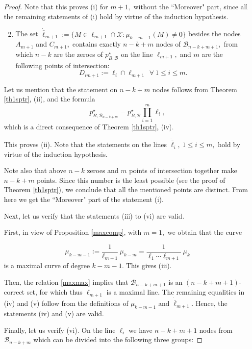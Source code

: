 \documentclass[a4paper,12pt]{article}
\theoremstyle{definition}
\numberwithin{equation}{section}
\numberwithin{figure}{section}
\newcommand{\Bset}{\mathcal{B}}
\newcommand{\Xset}{\mathcal{X}}
\begin{document}
\begin{proof}
Note that this proves (i) for $m+1,$ without the ``Moreover" part, since all the remaining statements of (i) hold by virtue of the induction hypothesis.
\begin{enumerate}[label*=\arabic*.]
\setcounter{enumi}{1}
\setlength{\itemsep}{0mm}
\item
The set $\dot{\bar\ell}_{m+1}:=\{M\in \ell_{m+1}\cap  \Xset: \mu_{k-m-1}(M)
\neq 0\}$ 
besides the nodes $A_{m+1}$ and $C_{m+1},$ contains exactly $n-k+m$ nodes of $\Bset_{n-k+m+1},$ from which $n-k$ are the zeroes of $p^\star_{B,\Bset}$ on the line $\ell_{m+1},$  and $m$ are the following points of intersection: 
$$D_{im+1}:=\ell_i\cap\ell_{m+1}\ \ \forall\ 1\le i \le m.$$ 
\end{enumerate}
Let us mention that the statement on $n-k+m$ nodes follows from Theorem \ref{th1sptr}, (ii), and  the formula
\begin{equation*}p^\star_{B,\Bset_{n-k+m}}=p^\star_{B,\Bset}\prod_{i=1}^m\ell_i,
\end{equation*}
 which is a direct consequence of Theorem \ref{th1sptr}, (iv).

\noindent This proves (ii). Note that the statements on the lines $\dot{\bar\ell}_i,\ 1\le i\le m,$ hold by virtue of the induction hypothesis.

Note also that above $n-k$ zeroes and $m$ points of intersection together make 
$n-k+m$ points. Since this number is the least possible (see the proof of Theorem \ref{th1sptr}), we conclude that all the mentioned
points are distinct. From here we get the ``Moreover" part of the statement (i).  

Next, let us verify that the statements (iii) to (vi) are valid.

First, in view of Proposition \ref{maxcomp}, with $m=1,$ we obtain that the curve 

$$\mu_{k-m-1}:=\frac{1}{\ell_{m+1}}\ \mu_{k-m}=\frac{1}{\ell_1\cdots\ell_{m+1}}\ \mu_{k}$$ is a maximal curve of degree $k-m-1.$ This gives (iii).
 

 Then, the relation \eqref{maxmax} implies that $\Bset_{n-k+m+1}$ is an  $(n-k+m+1)$-correct set, for which thus $\ell_{m+1}$ is a maximal line. The remaining equalities in (iv) and (v) follow from the definitions of $\mu_{k-m-1}$ and ${\dot{\bar{\ell}}}_{m+1}.$  Hence, the statements (iv) and (v) are valid. 

Finally, let us verify (vi). On the line $\ell_{i}$ we have $n-k+m+1$ nodes from $\Bset_{n-k+m}$ which can be divided into the following three groups:


\end{proof}
\end{document}

